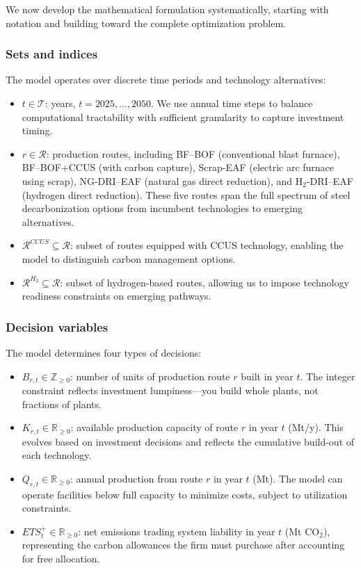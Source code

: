 We now develop the mathematical formulation systematically, starting with notation and building toward the complete optimization problem.

\subsubsection{Sets and indices}

The model operates over discrete time periods and technology alternatives:

\begin{itemize}[leftmargin=*]
    \item $t \in \mathcal{T}$: years, $t = 2025, \dots, 2050$. We use annual time steps to balance computational tractability with sufficient granularity to capture investment timing.
    \item $r \in \mathcal{R}$: production routes, including BF--BOF (conventional blast furnace), BF--BOF+CCUS (with carbon capture), Scrap-EAF (electric arc furnace using scrap), NG-DRI--EAF (natural gas direct reduction), and H$_2$-DRI--EAF (hydrogen direct reduction). These five routes span the full spectrum of steel decarbonization options from incumbent technologies to emerging alternatives.
    \item $\mathcal{R}^{CCUS} \subseteq \mathcal{R}$: subset of routes equipped with CCUS technology, enabling the model to distinguish carbon management options.
    \item $\mathcal{R}^{H_2} \subseteq \mathcal{R}$: subset of hydrogen-based routes, allowing us to impose technology readiness constraints on emerging pathways.
\end{itemize}

\subsubsection{Decision variables}

The model determines four types of decisions:

\begin{itemize}[leftmargin=*]
    \item $B_{r,t} \in \mathbb{Z}_{\ge 0}$: number of units of production route $r$ built in year $t$. The integer constraint reflects investment lumpiness—you build whole plants, not fractions of plants.
    \item $K_{r,t} \in \mathbb{R}_{\ge 0}$: available production capacity of route $r$ in year $t$ (Mt/y). This evolves based on investment decisions and reflects the cumulative build-out of each technology.
    \item $Q_{r,t} \in \mathbb{R}_{\ge 0}$: annual production from route $r$ in year $t$ (Mt). The model can operate facilities below full capacity to minimize costs, subject to utilization constraints.
    \item $ETS_{t}^{+} \in \mathbb{R}_{\ge 0}$: net emissions trading system liability in year $t$ (Mt CO$_2$), representing the carbon allowances the firm must purchase after accounting for free allocation.
\end{itemize}

